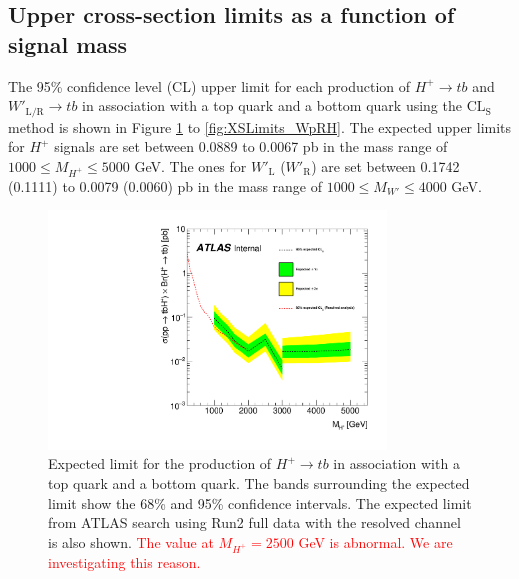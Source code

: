 \subsection{Upper cross-section limits as a function of signal mass}
\label{subsec:Upperlimits}
The 95\% confidence level (CL) upper limit for each production of $H^{+}{\rightarrow}tb$ and $W'_{\text{L/R}}{\rightarrow}tb$ in association with a top quark and a bottom quark using the $\text{CL}_{\text{S}}$ method is shown in Figure \ref{fig:XSLimits_Hp} to \ref{fig:XSLimits_WpRH}. The expected upper limits for $H^{+}$ signals are set between 0.0889 to 0.0067 pb in the mass range of $1000 \leq M_{H^{+}} \leq 5000$ GeV. The ones for $W'_{\text{L}}$ ($W'_{\text{R}}$) are set between 0.1742 (0.1111) to 0.0079 (0.0060) pb in the mass range of $1000 \leq M_{W'} \leq 4000$ GeV.

\begin{figure}[H]
  \centering
  \includegraphics[width=0.8\textwidth]{images/ProfileLHFit/XSUpperLimits_Hp.pdf}
  \caption{Expected limit for the production of $H^{+}{\rightarrow}tb$ in association with a top quark and a bottom quark. The bands surrounding the expected limit show the 68\% and 95\% confidence intervals. The expected limit from ATLAS search using Run2 full data with the resolved channel is also shown\cite{HDBS-2021-02}. \textcolor{red}{The value at $M_{H^{+}}=2500$ GeV is abnormal. We are investigating this reason.}}
  \label{fig:XSLimits_Hp}
\end{figure}

